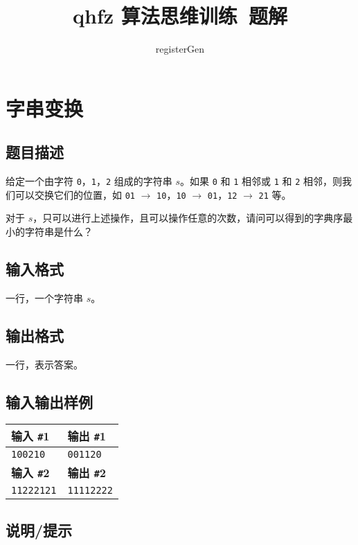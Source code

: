 \documentclass{article}
\title{qhfz 算法思维训练\ 题解}
\author{registerGen}
\date{}
\begin{document}
	\maketitle

	\tableofcontents
	
	\newpage

	\section{字串变换}

	\subsection{题目描述}

	给定一个由字符 \texttt{0}，\texttt{1}，\texttt{2} 组成的字符串 $s$。如果 \texttt{0} 和 \texttt{1} 相邻或 \texttt{1} 和 \texttt{2} 相邻，则我们可以交换它们的位置，如 \texttt{01} $\to$ \texttt{10}，\texttt{10} $\to$ \texttt{01}，\texttt{12} $\to$ \texttt{21} 等。

	对于 $s$，只可以进行上述操作，且可以操作任意的次数，请问可以得到的字典序最小的字符串是什么？

	\subsection{输入格式}

	一行，一个字符串 $s$。

	\subsection{输出格式}

	一行，表示答案。

	\subsection{输入输出样例}

	\begin{tabularx}{\textwidth}{|X|X|}
		\hline
		\textbf{输入 \texttt{\#}1} & \textbf{输出 \texttt{\#}1} \\
		\hline
		\texttt{100210} & \texttt{001120} \\ 
		\hline
		\textbf{输入 \texttt{\#}2} & \textbf{输出 \texttt{\#}2} \\
		\hline
		\texttt{11222121} & \texttt{11112222} \\ 
		\hline
	\end{tabularx}

	\subsection{说明/提示}
\end{document}
